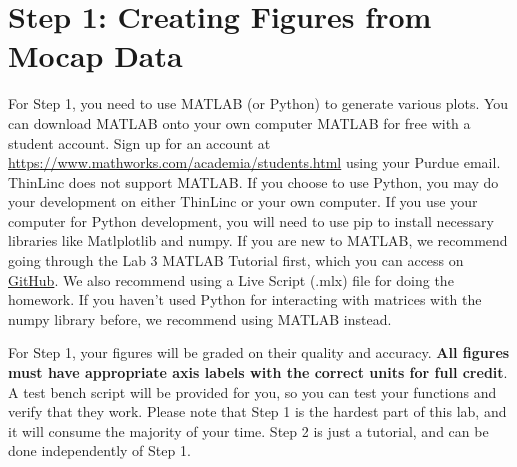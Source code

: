 \documentclass{article}
\numberwithin{figure}{section}
\begin{document}
\section*{Step 1: Creating Figures from Mocap Data}
\setcounter{section}{1}
\setcounter{figure}{0}
For Step 1, you need to use MATLAB (or Python) to generate various plots. You can download MATLAB onto your own computer MATLAB for free with a student account. Sign up for an account at \url{https://www.mathworks.com/academia/students.html} using your Purdue email. ThinLinc does not support MATLAB. If you choose to use Python, you may do your development on either ThinLinc or your own computer. If you use your computer for Python development, you will need to use pip to install necessary libraries like Matlplotlib and numpy. If you are new to MATLAB, we recommend going through the Lab 3 MATLAB Tutorial first, which you can access on \href{https://github.com/purdue-ece569-fall2025/Lab3}{GitHub}. We also recommend using a Live Script (.mlx) file for doing the homework. If you haven't used Python for interacting with matrices with the numpy library before, we recommend using MATLAB instead.

For Step 1, your figures will be graded on their quality and accuracy. \textbf{All figures must have appropriate axis labels with the correct units for full credit}. A test bench script will be provided for you, so you can test your functions and verify that they work. Please note that Step 1 is the hardest part of this lab, and it will consume the majority of your time. Step 2 is just a tutorial, and can be done independently of Step 1.
\end{document}
